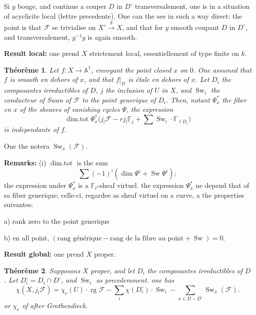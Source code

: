 \documentclass[11pt,a4paper]{article}
\theoremstyle{plain}
\newtheorem{theorem}{Th\'eor\`eme}
\theoremstyle{definition}
\DeclareMathOperator{\Sw}{Sw}
\DeclareMathOperator{\dimtot}{dim.tot}
\DeclareMathOperator{\rg}{rg}
\begin{document}
\newpage

Si $y$ bouge, and continue a couper $D$ in $D^\circ$ transversalement, one is in a situation of acyclicite local (lettre precedente). One can the see in such a way direct: the point is that $\mathcal{F}$ se trivialise on $X' \xrightarrow{g} X$, and that for $y$ smooth coupant $D$ in $D^\circ$, and transversalement, $g^{-1}y$ is again smooth.

\medskip

\noindent \textbf{Result local:} one prend $X$ strictement local, essentiellement of type finite on $k$.

\begin{theorem}
Let $f: X \to \mathbb{A}^1$, envoyant the point closed $x$ on $0$. One assumed that $f$ is smooth en dehors of $x$, and that $f|_D$ is étale en dehors of $x$. Let $D_i$ the composantes irreductibles of $D$, $j$ the inclusion of $U$ in $X$, and $\Sw_i$ the conducteur of Swan of $\mathcal{F}$ to the point generique of $D_i$. Then, notant $\Psi_x^*$ the fiber en $x$ of the sheaves of vanishing cycles $\Psi$, the expression
\[
\dimtot \Psi_x^* \bigl(j_! \mathcal{F} - r j_! \underline{\mathbb{F}}_\ell + \sum \Sw_i \cdot \mathbb{F}_{\ell D_i}\bigr)
\]
is independante of $f$.
\end{theorem}

\medskip

One the notera $\Sw_x(\mathcal{F})$.

\medskip

\noindent \textbf{Remarks:} (i) $\dimtot$ is the sum
\[
\sum (-1)^i (\dim \Psi^i + \Sw \Psi^i);
\]
the expression under $\Psi_x^*$ is a $\mathbb{F}_\ell$-sheaf virtuel. the expression $\Psi_x^*$ ne depend that of sa fiber generique; celle-ci, regardee as sheaf virtuel on a curve, a the properties suivantes:

\qquad a) rank zero to the point generique

\qquad b) en all point, $(\text{rang g\'en\'erique} - \text{rang de la fibre au point} + \Sw) = 0$.

\medskip

\noindent \textbf{Result global:} one prend $X$ proper.

\newpage

\begin{theorem}
Supposons $X$ proper, and let $D_i$ the composantes irreductibles of $D$. Let $D_i^\circ = D_i \cap D^\circ$, and $\Sw_i$ as precedemment. one has
\[
\chi(X, j_! \mathcal{F}) = \chi_c(U) \cdot \rg \mathcal{F} - \sum_i \chi(D_i^\circ) \cdot \Sw_i - \sum_{x \in D - D^\circ} \Sw_x(\mathcal{F}).
\]
or $\chi_c$ of after Grothendieck.
\end{theorem}
\end{document}

